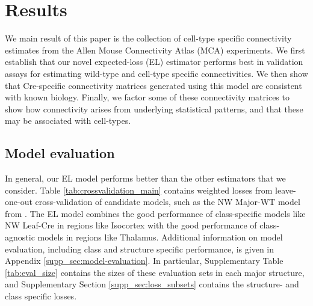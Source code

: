 \section{Results}
\label{sec:results}

We main result of this paper is the collection of cell-type specific connectivity estimates from the Allen Mouse Connectivity Atlas (MCA) experiments.
We first establish that our novel expected-loss (EL) estimator performs best in validation assays for estimating wild-type and cell-type specific connectivities.
We then show that Cre-specific connectivity matrices generated using this model are consistent with known biology. 
Finally, we factor some of these connectivity matrices to show how connectivity arises from underlying statistical patterns, and that these may be associated with cell-types.

\subsection{Model evaluation}
\label{sec:model_eval}

In general, our EL model performs better than the other estimators that we consider.
Table \ref{tab:crossvalidation_main} contains weighted losses from leave-one-out cross-validation of candidate models, such as the NW Major-WT model from \citet{Knox2019-ot}.
The EL model combines the good performance of class-specific models like NW Leaf-Cre in regions like Isocortex with the good performance of class-agnostic models in regions like Thalamus.
Additional information on model evaluation, including class and structure specific performance, is given in Appendix \ref{supp_sec:model-evaluation}.
In particular, Supplementary Table \ref{tab:eval_size} contains the sizes of these evaluation sets in each major structure, and Supplementary Section \ref{supp_sec:loss_subsets} contains the structure- and class specific losses.

